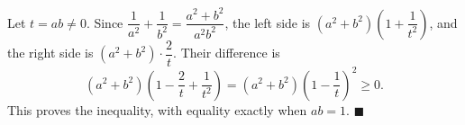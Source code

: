 Let $t=ab\ne0$. Since $\dfrac{1}{a^2}+\dfrac{1}{b^2}=\dfrac{a^2+b^2}{a^2b^2}$, the left side is $\left(a^2+b^2\right)\left(1+\dfrac{1}{t^2}\right)$, and the right side is $\left(a^2+b^2\right)\cdot\dfrac2t$. Their difference is
\[\left(a^2+b^2\right)\left(1-\dfrac2t+\dfrac1{t^2}\right)=\left(a^2+b^2\right)\left(1-\dfrac1t\right)^2\ge0.\]
This proves the inequality, with equality exactly when $ab=1$. $\blacksquare$

